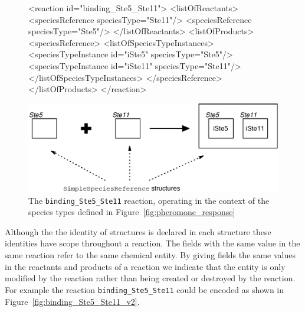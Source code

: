 \documentclass{cekarticle}
\begin{document}
\begin{figure}[h]
\begin{example}
<reaction id="binding_Ste5_Ste11">
    <listOfReactants>
        <speciesReference speciesType="Ste11"/>
        <speciesReference speciesType="Ste5"/>
    </listOfReactants>
    <listOfProducts>
        <speciesReference>
            <listOfSpeciesTypeInstances>
                <speciesTypeInstance id="iSte5" speciesType="Ste5"/>
                <speciesTypeInstance id="iSte11" speciesType="Ste11"/>
            </listOfSpeciesTypeInstances>
        </speciesReference>
    </listOfProducts>
</reaction>
\end{example}
  \vspace*{8pt}
  \centering
  \includegraphics[scale = 0.7]{binding_Ste5_Ste11.eps}
  \caption{The \texttt{binding\_Ste5\_Ste11} reaction, operating in the context of the species types
  defined in Figure~\ref{fig:pheromone_response}}
  \label{fig:binding_Ste5_Ste11}
\end{figure}

Although the the identity of  structures is declared in each
 structure these identities have scope throughout a reaction.
The   fields with the same value in the same reaction refer
to the same chemical entity.  By giving   fields the same values
in the reactants and products of a reaction we indicate that the entity is only modified by the reaction
rather than being created or destroyed by the reaction.  For example the reaction
\texttt{binding\_Ste5\_Ste11} could be encoded as shown in Figure~\ref{fig:binding_Ste5_Ste11_v2}.
\end{document}
